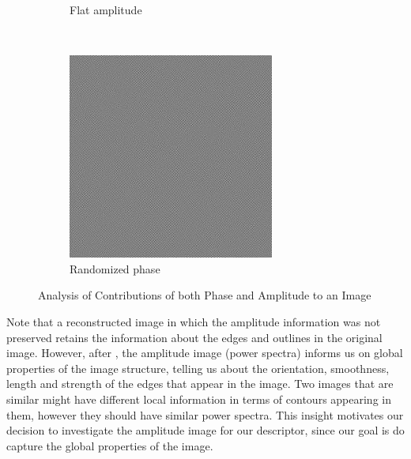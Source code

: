 \documentclass{report}
\begin{document}
\begin{figure}[H]
\begin{subfigure}[b]{0.2\textwidth}
                \caption{Flat amplitude}
                \label{fig:mouse}
        \end{subfigure}
        ~
        \begin{subfigure}[b]{0.2\textwidth}
                \includegraphics[width=\textwidth]{graphics/randomized_phase.jpg}
                \caption{Randomized phase}
                \label{fig:tiger}
        \end{subfigure}
        \caption{Analysis of Contributions of both Phase and Amplitude to an Image}\label{fig:fft_randomization}
\end{figure}
Note that a reconstructed image in which the amplitude information was not preserved retains the information about the edges and outlines in the original image. However, after \cite{gist_descriptor}, the amplitude image (power spectra) informs us on global properties of the image structure, telling us about the orientation, smoothness, length and strength of the edges that appear in the image.
Two images that are similar might have different local information in terms of contours appearing in them, however they should have similar power spectra. This insight motivates our decision to investigate the amplitude image for our descriptor, since our goal is do capture the global properties of the image.
\end{document}
